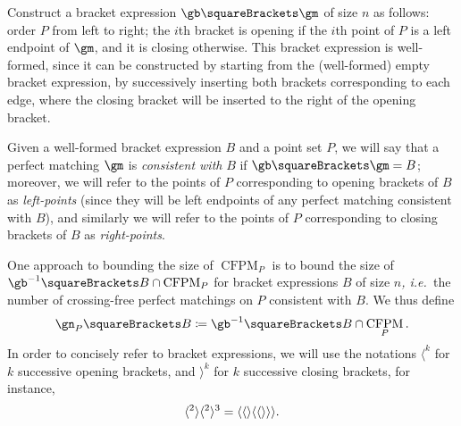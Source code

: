 \documentclass[10pt, a4paper, twoside]{basestyle}
\newcommand{\idest}{\emph{, i.e.\ }}
\DeclareMathOperator{\CFPM}{CFPM}
\begin{document}
Construct a bracket expression $\gb\of\gm$ of size $n$ as follows: order $P$ from left to right;
the $i$th bracket is opening if the $i$th point of $P$ is a left endpoint of $\gm$, and it is
closing otherwise.
This bracket expression is well-formed, since it can be constructed by starting from the
(well-formed) empty bracket expression, by successively inserting both brackets corresponding to
each edge, where the closing bracket will be inserted to the right of the opening bracket.

Given a well-formed bracket expression $B$ and a point set $P$, we will say that a perfect matching
$\gm$ is \emph{consistent with} $B$ if $\gb\of\gm = B$; moreover, we will refer to the points of
$P$ corresponding to opening brackets of $B$ as \emph{left-points} (since they will be left endpoints
of any perfect matching consistent with $B$), and similarly we will refer to the points of $P$
corresponding to closing brackets of $B$ as \emph{right-points}.

One approach to bounding the size of $\CFPM_P$ is to bound the size of
$\gb^{-1}\of{B}\Intersection \CFPM_P$ for bracket expressions $B$ of size $n$\idest the
number of crossing-free perfect matchings on $P$ consistent with $B$. We thus define
\[\gn_P\of B \DefineAs \gb^{-1}\of{B}\Intersection \CFPM_P\text.\]
In order to concisely refer to bracket expressions, we will use the notations
$\langle^k$ for $k$ successive opening brackets, and $\rangle^k$ for $k$ successive
closing brackets, for instance,\[
\langle^2\rangle\langle^2\rangle^3 = \langle\langle\rangle\langle\langle\rangle\rangle\rangle
\text.\]
\end{document}
